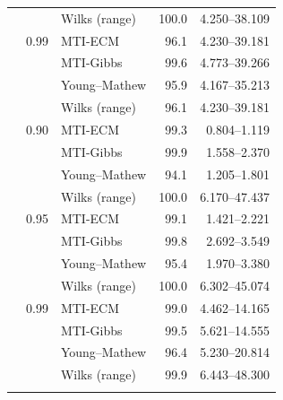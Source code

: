 \begin{longtable}{@{}rrlrr@{}}
 &  & Wilks (range) & 100.0 & 4.250--38.109 \\
\addlinespace[0.3em]
500 & 0.99 & MTI-ECM & 96.1 & 4.230--39.181 \\
 &  & MTI-Gibbs & 99.6 & 4.773--39.266 \\
 &  & Young--Mathew & 95.9 & 4.167--35.213 \\
 &  & Wilks (range) & 96.1 & 4.230--39.181 \\
\addlinespace[0.3em]
1000 & 0.90 & MTI-ECM & 99.3 & 0.804--1.119 \\
 &  & MTI-Gibbs & 99.9 & 1.558--2.370 \\
 &  & Young--Mathew & 94.1 & 1.205--1.801 \\
 &  & Wilks (range) & 100.0 & 6.170--47.437 \\
\addlinespace[0.3em]
1000 & 0.95 & MTI-ECM & 99.1 & 1.421--2.221 \\
 &  & MTI-Gibbs & 99.8 & 2.692--3.549 \\
 &  & Young--Mathew & 95.4 & 1.970--3.380 \\
 &  & Wilks (range) & 100.0 & 6.302--45.074 \\
\addlinespace[0.3em]
1000 & 0.99 & MTI-ECM & 99.0 & 4.462--14.165 \\
 &  & MTI-Gibbs & 99.5 & 5.621--14.555 \\
 &  & Young--Mathew & 96.4 & 5.230--20.814 \\
 &  & Wilks (range) & 99.9 & 6.443--48.300 \\
\addlinespace[0.3em]
\end{longtable}
\clearpage
